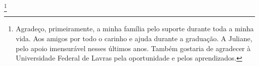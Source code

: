 \thanks{%
Agradeço, primeiramente, a minha família pelo suporte durante toda a minha vida. Aos amigos por todo o carinho e ajuda durante a graduação. A Juliane, pelo apoio imensurável nesses últimos anos. Também gostaria de agradecer à Universidade Federal de Lavras pela oportunidade e pelos aprendizados.
}
